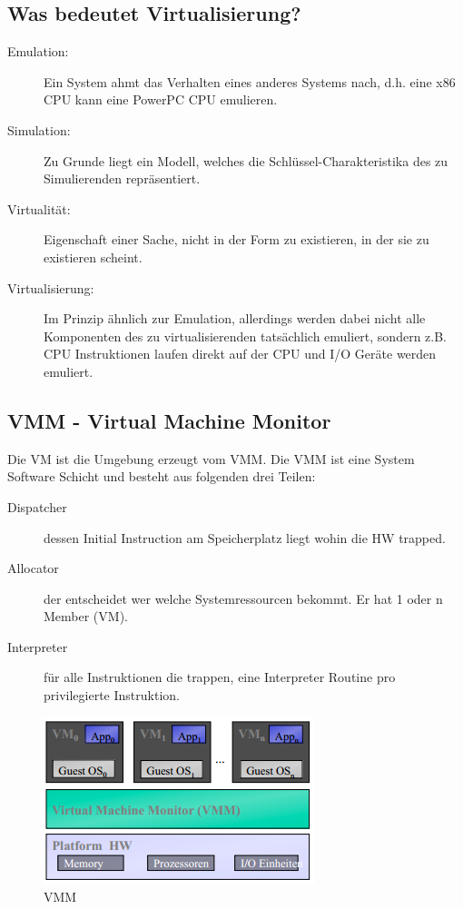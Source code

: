 \subsection{Was bedeutet Virtualisierung?}
\label{sec:was-bedeutet-virtualisierung}
\begin{description}
	\item[Emulation:] Ein System ahmt das Verhalten eines anderes Systems nach, d.h. eine x86 CPU kann eine PowerPC CPU emulieren.
	\item[Simulation:] Zu Grunde liegt ein Modell, welches die Schlüssel-Charakteristika des zu Simulierenden repräsentiert.
	\item[Virtualität:] Eigenschaft einer Sache, nicht in der Form zu existieren, in der sie zu existieren scheint.
	\item[Virtualisierung:] Im Prinzip ähnlich zur Emulation, allerdings werden dabei nicht alle Komponenten des zu virtualisierenden tatsächlich emuliert, sondern z.B. CPU Instruktionen laufen direkt auf der CPU und I/O Geräte werden emuliert.
\end{description}

\subsection{VMM - Virtual Machine Monitor}
\label{sec:vmm-virtual-machine-monitor}
Die VM ist die Umgebung erzeugt vom VMM. Die VMM ist eine System Software Schicht und besteht aus folgenden drei Teilen:
\begin{description}
	\item[Dispatcher] dessen Initial Instruction am Speicherplatz liegt wohin die HW trapped.
	\item[Allocator] der entscheidet wer welche Systemressourcen bekommt. Er hat 1 oder n Member (VM).
	\item[Interpreter] für alle Instruktionen die trappen, eine Interpreter Routine pro privilegierte Instruktion.
\end{description}

\begin{figure}[h!]
	\centering
	\includegraphics[width=0.4\linewidth]{fig/vmm}
	\caption{VMM}
	\label{fig:vmm}
\end{figure}

